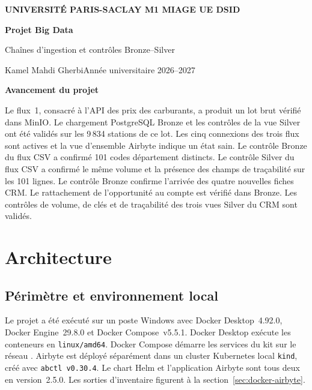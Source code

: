 \documentclass[11pt,a4paper]{article}
\newcommand{\etudiant}{Kamel Mahdi Gherbi}
\newcommand{\code}[1]{\texttt{#1}}
\begin{document}
\begin{titlepage}
  {\small\bfseries UNIVERSITÉ PARIS-SACLAY \quad M1 MIAGE \quad UE DSID\par}
  \vspace{2.2cm}
  {\Huge\bfseries\color{encre} Projet Big Data\par}
  \medskip
  {\Large Chaînes d'ingestion et contrôles Bronze--Silver\par}
  \bigskip
  \etudiant \hfill Année universitaire 2026--2027
  \vfill

  \textbf{Avancement du projet}

  Le flux~1, consacré à l'API des prix des carburants, a produit un lot
  brut vérifié dans MinIO. Le chargement PostgreSQL Bronze et les
  contrôles de la vue Silver ont été validés sur les 9\,834 stations
  de ce lot. Les cinq connexions des trois flux sont actives et la
  vue d'ensemble Airbyte indique un état sain. Le contrôle Bronze
  du flux CSV a confirmé 101 codes département distincts.
  Le contrôle Silver du flux CSV a confirmé le même volume et la
  présence des champs de traçabilité sur les 101 lignes.
  Le contrôle Bronze confirme l'arrivée des quatre nouvelles fiches CRM.
  Le rattachement de l'opportunité au compte est vérifié dans Bronze.
  Les contrôles de volume, de clés et de traçabilité des trois vues Silver du CRM sont validés.
\end{titlepage}

\tableofcontents
\clearpage

\section{Architecture}
\label{sec:architecture}

\subsection{Périmètre et environnement local}

Le projet a été exécuté sur un poste Windows avec Docker
Desktop~4.92.0, Docker Engine~29.8.0 et Docker Compose~v5.5.1.
Docker Desktop exécute les conteneurs en \code{linux/amd64}.
Docker Compose démarre les services du kit sur le réseau
. Airbyte est déployé séparément dans un
cluster Kubernetes local \code{kind}, créé avec \code{abctl v0.30.4}.
Le chart Helm et l'application Airbyte sont tous deux en version~2.5.0.
Les sorties d'inventaire figurent à la section~\ref{sec:docker-airbyte}.
\end{document}
